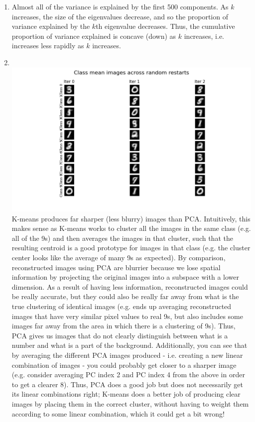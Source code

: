 \documentclass[submit]{harvardml}
\begin{document}
\begin{enumerate}
  \item Almost all of the variance is explained by the first 500 components. As $k$ increases, the size of the eigenvalues decrease, and so the proportion of variance explained by the $k$th eigenvalue decreases. Thus, the cumulative proportion of variance explained is concave (down) as $k$ increases, i.e. increases less rapidly as $k$ increases.
  
  \item \quad\\
  \includegraphics[width=0.75\linewidth]{HW4/2.2.png}\\
  K-means produces far sharper (less blurry) images than PCA. Intuitively, this makes sense as K-means works to cluster all the images in the same class (e.g. all of the 9s) and then averages the images in that cluster, such that the resulting centroid is a good prototype for images in that class (e.g. the cluster center looks like the average of many 9s as expected). By comparison, reconstructed images using PCA are blurrier because we lose spatial information by projecting the original images into a subspace with a lower dimension. As a result of having less information, reconstructed images could be really accurate, but they could also be really far away from what is the true clustering of identical images (e.g. ends up averaging reconstructed images that have very similar pixel values to real 9s, but also includes some images far away from the area in which there is a clustering of 9s). Thus, PCA gives us images that do not clearly distinguish between what is a number and what is a part of the background. Additionally, you can see that by averaging the different PCA images produced - i.e. creating a new linear combination of images - you could probably get closer to a sharper image (e.g. consider averaging PC index 2 and PC index 4 from the above in order to get a clearer 8). Thus, PCA does a good job but does not necessarily get its linear combinations right; K-means does a better job of producing clear images by placing them in the correct cluster, without having to weight them according to some linear combination, which it could get a bit wrong!
  

\end{enumerate}
\end{document}
